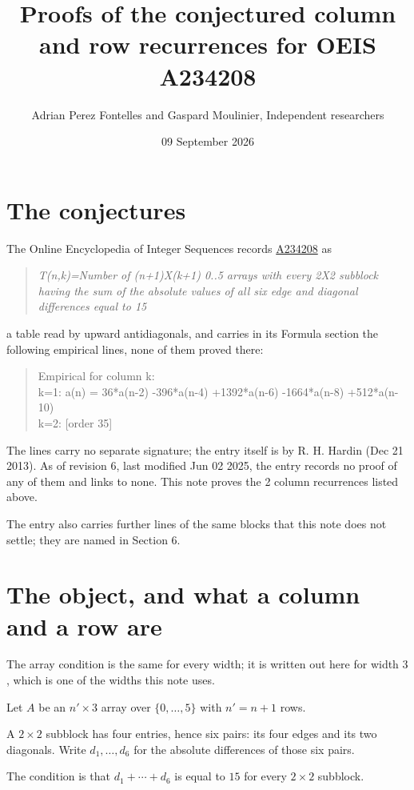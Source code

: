 \documentclass[11pt]{article}
\title{Proofs of the conjectured column and row recurrences for OEIS A234208}
\author{Adrian Perez Fontelles and Gaspard Moulinier, Independent researchers}
\date{09 September 2026}
\theoremstyle{definition}
\begin{document}
\maketitle
\section{The conjectures}

The Online Encyclopedia of Integer Sequences records \href{https://oeis.org/A234208}{A234208} as

\begin{quote}\itshape T(n,k)=Number of (n+1)X(k+1) 0..5 arrays with every 2X2 subblock having the sum of the absolute values of all six edge and diagonal differences equal to 15\end{quote}

a table read by upward antidiagonals, and carries in its Formula section the following empirical lines, none of them proved there:

\begin{quote}\ttfamily Empirical for column k:\\
k=1: a(n) = 36*a(n-2) -396*a(n-4) +1392*a(n-6) -1664*a(n-8) +512*a(n-10)\\k=2: [order 35]\end{quote}

The lines carry no separate signature; the entry itself is by R. H. Hardin (Dec 21 2013). As of revision 6, last modified Jun 02 2025, the entry records no proof of any of them and links to none. This note proves the 2 column recurrences listed above.

The entry also carries further lines of the same blocks that this note does not settle; they are named in Section 6.

\section{The object, and what a column and a row are}

The array condition is the same for every width; it is written out here for width $3$, which is one of the widths this note uses.

Let $A$ be an $n' \times 3$ array over $\{0,\dots,5\}$ with $n' = n + 1$ rows.

A $2\times2$ subblock has four entries, hence six pairs: its four edges and its two diagonals. Write $d_1,\dots,d_6$ for the absolute differences of those six pairs.

The condition is that $d_1+\cdots+d_6$ is equal to $15$ for every $2\times2$ subblock.
\end{document}

